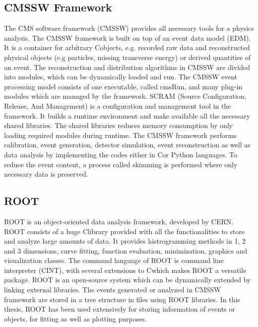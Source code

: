 \subsection{CMSSW Framework}
The CMS software framework (CMSSW) \cite{CMS:2005aa} provides all necessary tools for a physics analysis. The CMSSW framework is built on top of an event data model (EDM). It is a container for arbitrary C\plusn\plus objects, e.g. recorded raw data and reconstructed physical objects (e.g particles, missing transverse energy) or derived quantities of an event. The reconstruction and distribution algorithms in CMSSW are divided into modules, which can be dynamically loaded and run. The CMSSW event processing model consists of one executable, called cmsRun, and many plug-in modules which are managed by the framework. SCRAM (Source Configuration, Release, And Management) is a configuration and management tool in the framework. It builds a runtime environment and make available all the necessary shared libraries. The shared libraries reduces memory consumption by only loading required modules during runtime. The CMSSW framework performs calibration, event generation, detector simulation, event reconstruction as well as data analysis by implementing the codes either in C\plusn\plus or Python languages. To reduce the event content, a process called skimming is performed where only necessary data is preserved. 

\subsection{ROOT}
ROOT \cite{Brun:1997pa} is an object-oriented data analysis framework, developed by CERN. ROOT consists of a huge C\plusn\plus library provided with all the functionalities to store and analyze large amounts of data. It provides histrogramming methods in 1, 2 and 3 dimensions, curve fitting, function evaluation, minimization, graphics and visualization classes. The command language of ROOT is command line interpreter (CINT), with several extensions to C\plusn\plus which makes ROOT a versatile package. ROOT is an open-source system which can be dynamically extended by linking external libraries. The events generated or analyzed in CMSSW framework are stored in a tree structure in files using ROOT libraries. In this thesis, ROOT has been used extensively for storing information of events or objects, for fitting as well as plotting purposes.
